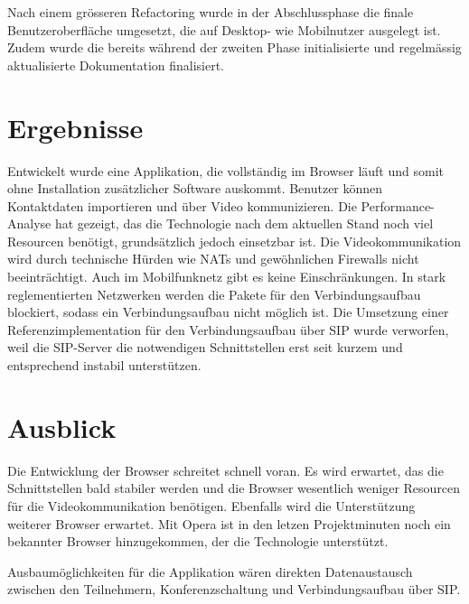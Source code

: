Nach einem grösseren Refactoring wurde in der Abschlussphase die finale Benutzeroberfläche umgesetzt, die auf Desktop- wie Mobilnutzer ausgelegt ist.
Zudem wurde die bereits während der zweiten Phase initialisierte und regelmässig aktualisierte Dokumentation finalisiert.


\section{Ergebnisse}
Entwickelt wurde eine Applikation, die vollständig im Browser läuft und somit ohne Installation zusätzlicher Software auskommt.
Benutzer können Kontaktdaten importieren und über Video kommunizieren.
Die Performance-Analyse hat gezeigt, das die Technologie nach dem aktuellen Stand noch viel Resourcen benötigt, grundsätzlich jedoch einsetzbar ist.
Die Videokommunikation wird durch technische Hürden wie NATs und gewöhnlichen Firewalls nicht beeinträchtigt. Auch im Mobilfunknetz gibt es keine Einschränkungen.
In stark reglementierten Netzwerken werden die Pakete für den Verbindungsaufbau blockiert, sodass ein Verbindungsaufbau nicht möglich ist.
Die Umsetzung einer Referenzimplementation für den Verbindungsaufbau über SIP wurde verworfen, weil die SIP-Server die notwendigen Schnittstellen erst seit kurzem und entsprechend instabil unterstützen.


\section{Ausblick}
Die Entwicklung der Browser schreitet schnell voran. Es wird erwartet, das die Schnittstellen bald stabiler werden und die Browser wesentlich weniger Resourcen für die Videokommunikation benötigen. Ebenfalls wird die Unterstützung weiterer Browser erwartet. Mit Opera ist in den letzen Projektminuten noch ein bekannter Browser hinzugekommen, der die Technologie unterstützt.

Ausbaumöglichkeiten für die Applikation wären direkten Datenaustausch zwischen den Teilnehmern, Konferenzschaltung und Verbindungsaufbau über SIP.
